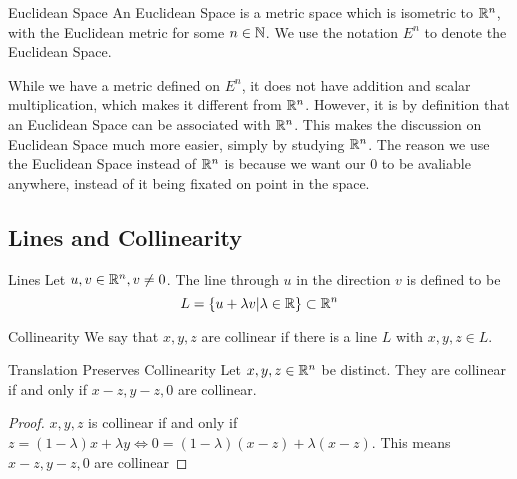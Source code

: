 \documentclass[a4paper]{article}
\begin{document}
\begin{defn}{Euclidean Space}{} An Euclidean Space is a metric space which is isometric to $\mathbb{R}^n$, with the Euclidean metric for some $n\in\mathbb{N}$. We use the notation $E^n$ to denote the Euclidean Space. 
\end{defn}

While we have a metric defined on $E^n$, it does not have addition and scalar multiplication, which makes it different from $\mathbb{R}^n$. However, it is by definition that an Euclidean Space can be associated with $\mathbb{R}^n$. This makes the discussion on Euclidean Space much more easier, simply by studying $\mathbb{R}^n$. \linebreak\linebreak
The reason we use the Euclidean Space instead of $\mathbb{R}^n$ is because we want our $0$ to be avaliable anywhere, instead of it being fixated on point in the space. 

\subsection{Lines and Collinearity}
\begin{defn}{Lines}{} Let $u,v\in\mathbb{R}^n, v\neq 0$. The line through $u$ in the direction $v$ is defined to be $$L=\{u+\lambda v|\lambda\in\mathbb{R}\}\subset\mathbb{R}^n$$
\end{defn}

\begin{defn}{Collinearity}{} We say that $x,y,z$ are collinear if there is a line $L$ with $x,y,z\in L$. 
\end{defn}

\begin{lmm}{Translation Preserves Collinearity}{} Let $x,y,z\in\mathbb{R}^n$ be distinct. They are collinear if and only if $x-z,y-z,0$ are collinear. \tcbline\begin{proof} $x,y,z$ is collinear if and only if $z=(1-\lambda)x+\lambda y\iff 0=(1-\lambda)(x-z)+\lambda(x-z)$. This means $x-z,y-z,0$ are collinear
\end{proof}
\end{lmm}
\end{document}
